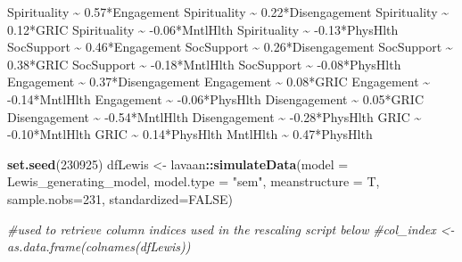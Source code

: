 \documentclass[
  11pt,
]{book}
\newenvironment{Shaded}{\begin{snugshade}}{\end{snugshade}}
\newcommand{\AttributeTok}[1]{\textcolor[rgb]{0.27,0.27,0.27}{#1}}
\newcommand{\CommentTok}[1]{\textcolor[rgb]{0.37,0.37,0.37}{\textit{#1}}}
\newcommand{\ConstantTok}[1]{\textcolor[rgb]{0.37,0.37,0.37}{#1}}
\newcommand{\DecValTok}[1]{\textcolor[rgb]{0.06,0.06,0.06}{#1}}
\newcommand{\FunctionTok}[1]{\textcolor[rgb]{0.27,0.27,0.27}{\textbf{#1}}}
\newcommand{\NormalTok}[1]{#1}
\newcommand{\OtherTok}[1]{\textcolor[rgb]{0.37,0.37,0.37}{#1}}
\newcommand{\SpecialCharTok}[1]{\textcolor[rgb]{0.43,0.43,0.43}{\textbf{#1}}}
\newcommand{\StringTok}[1]{\textcolor[rgb]{0.5,0.5,0.5}{#1}}
\begin{document}
\begin{Shaded}
\begin{Highlighting}[]
\StringTok{         Spirituality \textasciitilde{} 0.57*Engagement}
\StringTok{         Spirituality \textasciitilde{} 0.22*Disengagement}
\StringTok{         Spirituality \textasciitilde{} 0.12*GRIC}
\StringTok{         Spirituality \textasciitilde{} {-}0.06*MntlHlth}
\StringTok{         Spirituality \textasciitilde{} {-}0.13*PhysHlth}
\StringTok{         }
\StringTok{         SocSupport \textasciitilde{} 0.46*Engagement}
\StringTok{         SocSupport \textasciitilde{} 0.26*Disengagement}
\StringTok{         SocSupport \textasciitilde{} 0.38*GRIC}
\StringTok{         SocSupport \textasciitilde{} {-}0.18*MntlHlth}
\StringTok{         SocSupport \textasciitilde{} {-}0.08*PhysHlth}
\StringTok{         }
\StringTok{         Engagement \textasciitilde{} 0.37*Disengagement}
\StringTok{         Engagement \textasciitilde{} 0.08*GRIC}
\StringTok{         Engagement \textasciitilde{} {-}0.14*MntlHlth}
\StringTok{         Engagement \textasciitilde{} {-}0.06*PhysHlth}
\StringTok{         }
\StringTok{         Disengagement \textasciitilde{} 0.05*GRIC}
\StringTok{         Disengagement \textasciitilde{} {-}0.54*MntlHlth}
\StringTok{         Disengagement \textasciitilde{} {-}0.28*PhysHlth}
\StringTok{         }
\StringTok{         GRIC \textasciitilde{} {-}0.10*MntlHlth}
\StringTok{         GRIC \textasciitilde{} 0.14*PhysHlth}
\StringTok{     }
\StringTok{         MntlHlth \textasciitilde{} 0.47*PhysHlth         }
\StringTok{        \textquotesingle{}}

\FunctionTok{set.seed}\NormalTok{(}\DecValTok{230925}\NormalTok{)}
\NormalTok{dfLewis }\OtherTok{\textless{}{-}}\NormalTok{ lavaan}\SpecialCharTok{::}\FunctionTok{simulateData}\NormalTok{(}\AttributeTok{model =}\NormalTok{ Lewis\_generating\_model,}
                              \AttributeTok{model.type =} \StringTok{"sem"}\NormalTok{,}
                              \AttributeTok{meanstructure =}\NormalTok{ T,}
                              \AttributeTok{sample.nobs=}\DecValTok{231}\NormalTok{,}
                              \AttributeTok{standardized=}\ConstantTok{FALSE}\NormalTok{)}

\CommentTok{\#used to retrieve column indices used in the rescaling script below}
\CommentTok{\#col\_index \textless{}{-} as.data.frame(colnames(dfLewis))}


\end{Highlighting}
\end{Shaded}
\end{document}
